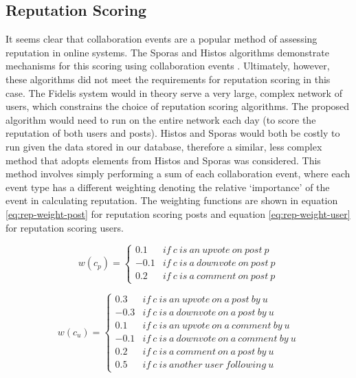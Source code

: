 \subsection{Reputation Scoring}
It seems clear that collaboration events are a popular method of assessing reputation in online systems. The Sporas and Histos algorithms demonstrate mechanisms for this scoring using collaboration events \cite{mcnally2013} \cite{zacharia2000}. Ultimately, however, these algorithms did not meet the requirements for reputation scoring in this case. The Fidelis system would in theory serve a very large, complex network of users, which constrains the choice of reputation scoring algorithms. The proposed algorithm would need to run on the entire network each day (to score the reputation of both users and posts). Histos and Sporas would both be costly to run given the data stored in our database, therefore a similar, less complex method that adopts elements from Histos and Sporas was considered. This method involves simply performing a sum of each collaboration event, where each event type has a different weighting denoting the relative `importance' of the event in calculating reputation. The weighting functions are shown in equation \ref{eq:rep-weight-post} for reputation scoring posts and equation \ref{eq:rep-weight-user} for reputation scoring users.

\begin{equation}
	\label{eq:rep-weight-post}
	 w(c_p) = \left\{\begin{matrix}
			0.1 & if\ c\ is\ an\ upvote\ on\ post\ p \\ 
			-0.1 & if\ c\ is\ a\ downvote\ on\ post\ p \\ 
			0.2 & if\ c\ is\ a\ comment\ on\ post\ p
	\end{matrix}\right.
\end{equation}

\begin{equation}
	\label{eq:rep-weight-user}
		w(c_u) = \left\{\begin{matrix}
			0.3 & if\ c\ is\ an\ upvote\ on\ a\ post\ by\ u\\ 
			-0.3 & if\ c\ is\ a\ downvote\ on\ a\ post\ by\ u \\ 
			0.1 & if\ c\ is\ an\ upvote\ on\ a\ comment\ by\ u \\ 
			-0.1 & if\ c\ is\ a\ downvote\ on\ a\ comment\ by\ u \\ 
			0.2 & if\ c\ is\ a\ comment\ on\ a\ post\ by\ u\\ 
			0.5 & if\ c\ is\ another\ user\ following\ u
		\end{matrix}\right.
\end{equation}

